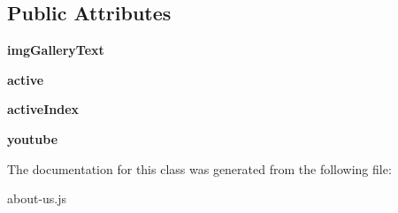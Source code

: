 \subsection*{Public Attributes}
\begin{DoxyCompactItemize}
\item 
\hypertarget{classabout__us__module_1_1imgGalleryController_a5a314bbda4c1a9a9cd407c776e5db554}{{\bfseries img\-Gallery\-Text}}\label{classabout__us__module_1_1imgGalleryController_a5a314bbda4c1a9a9cd407c776e5db554}

\item 
\hypertarget{classabout__us__module_1_1imgGalleryController_a73dfed5ee9c4af1ba32f07678841ad5d}{{\bfseries active}}\label{classabout__us__module_1_1imgGalleryController_a73dfed5ee9c4af1ba32f07678841ad5d}

\item 
\hypertarget{classabout__us__module_1_1imgGalleryController_adcee86e51598901ab32eea0c5352902b}{{\bfseries active\-Index}}\label{classabout__us__module_1_1imgGalleryController_adcee86e51598901ab32eea0c5352902b}

\item 
\hypertarget{classabout__us__module_1_1imgGalleryController_ac643f17760b71339b67e480f9acdd314}{{\bfseries youtube}}\label{classabout__us__module_1_1imgGalleryController_ac643f17760b71339b67e480f9acdd314}

\end{DoxyCompactItemize}


The documentation for this class was generated from the following file\-:\begin{DoxyCompactItemize}
\item 
about-\/us.\-js\end{DoxyCompactItemize}

